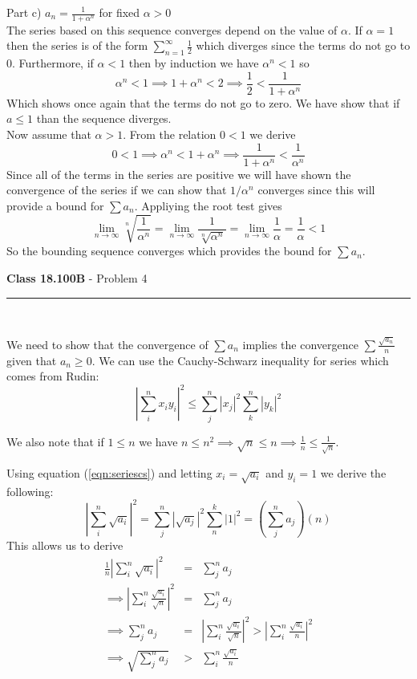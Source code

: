 \documentclass[11pt,reqno]{article}
\begin{document}
Part c) $a_n = \frac{1}{1+\alpha^n}$ for fixed $\alpha > 0$\\
The series based on this sequence converges depend on the value of $\alpha$. If $\alpha = 1$ then the series is of the form $\sum_{n = 1}^\infty \frac{1}{2}$ which diverges since the terms do not go to 0. Furthermore, if $\alpha < 1$ then by induction we have $\alpha^n < 1$ so 
\[ \alpha^n < 1 \implies 1+ \alpha^n < 2 \implies \frac{1}{2} < \frac{1}{1+\alpha^n} \]
Which shows once again that the terms do not go to zero. We have show that if $a \le 1$ than the sequence diverges. \\
\indent Now assume that $\alpha > 1$. From the relation $0 < 1$ we derive \[ 0 < 1 \implies \alpha^n < 1+ \alpha^n \implies \frac{1}{1+\alpha^n} < \frac{1}{\alpha^n} \]
Since all of the terms in the series are positive we will have shown the convergence of the series if we can show that $1/ \alpha^n$ converges since this will provide a bound for $\sum a_n$. Appliying the root test gives
\[ \lim_{n \to \infty} \sqrt[n]{\frac{1}{\alpha^n}} = \lim_{n \to \infty} \frac{1}{ \sqrt[n]{\alpha^n} } =  \lim_{n \to \infty} \frac{1}{\alpha} =  \frac{1}{\alpha} < 1 \]
So the bounding sequence converges which provides the bound for $\sum a_n$.


\newpage
\vspace{15pt}
\begin{flushleft} 
\textbf{Class 18.100B} - Problem 4\\
\rule{500pt}{1pt}\\
\end{flushleft} 

We need to show that the convergence of $\sum a_n$ implies the convergence $\sum \frac{\sqrt{a_n}}{n}$ given that $a_n \ge 0$. We can use the Cauchy-Schwarz inequality for series which comes from Rudin:
\begin{equation}
|\sum_i^n x_i y_i|^2 \le \sum_j^n | x_j |^2 \sum_k^n | y_k |^2 \label{eqn:seriescs}
\end{equation}

\noindent We also note that if $1 \le n$ we have $n \le n^2 \implies \sqrt{n} \le n \implies \frac{1}{n} \le \frac{1}{\sqrt{n}} $.

\noindent Using equation (\ref{eqn:seriescs}) and letting $x_i = \sqrt{a_i}$ and $y_i = 1$ we derive the following:
\[  | \sum_i^n \sqrt{a_i} |^2   = \sum_j^n | \sqrt{a_j} |^2 \sum_n^k | 1 |^2  = (\sum_j^n a_j)(n)  \]
This allows us to derive
\begin{eqnarray*}
 \frac{1}{n} | \sum_i^n \sqrt{a_i} |^2  &=& \sum_j^n a_j \\
 \implies  | \sum_i^n \frac{\sqrt{a_i}}{\sqrt{n}} |^2  &=& \sum_j^n a_j \\
 \implies \sum_j^n a_j &=& | \sum_i^n \frac{\sqrt{a_i}}{\sqrt{n}} |^2  >  | \sum_i^n \frac{\sqrt{a_i}}{n} |^2 \\
 \implies \sqrt{\sum_j^n a_j} &>& \sum_i^n \frac{\sqrt{a_i}}{n}
\end{eqnarray*}
\end{document}
